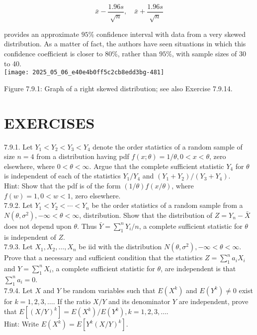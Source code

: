 $$
\bar{x}-\frac{1.96 s}{\sqrt{n}}, \quad \bar{x}+\frac{1.96 s}{\sqrt{n}}
$$

provides an approximate $95 \%$ confidence interval with data from a very skewed distribution. As a matter of fact, the authors have seen situations in which this confidence coefficient is closer to $80 \%$, rather than $95 \%$, with sample sizes of 30 to 40.\\
\texttt{[image: 2025\_05\_06\_e40e4b0ff5c2cb8edd3bg-481]}

Figure 7.9.1: Graph of a right skewed distribution; see also Exercise 7.9.14.

\section*{EXERCISES}
7.9.1. Let $Y_{1}<Y_{2}<Y_{3}<Y_{4}$ denote the order statistics of a random sample of size $n=4$ from a distribution having pdf $f(x ; \theta)=1 / \theta, 0<x<\theta$, zero elsewhere, where $0<\theta<\infty$. Argue that the complete sufficient statistic $Y_{4}$ for $\theta$ is independent of each of the statistics $Y_{1} / Y_{4}$ and $\left(Y_{1}+Y_{2}\right) /\left(Y_{3}+Y_{4}\right)$.\\
Hint: Show that the pdf is of the form $(1 / \theta) f(x / \theta)$, where $f(w)=1,0<w<1$, zero elsewhere.\\
7.9.2. Let $Y_{1}<Y_{2}<\cdots<Y_{n}$ be the order statistics of a random sample from a $N\left(\theta, \sigma^{2}\right),-\infty<\theta<\infty$, distribution. Show that the distribution of $Z=Y_{n}-\bar{X}$ does not depend upon $\theta$. Thus $\bar{Y}=\sum_{1}^{n} Y_{i} / n$, a complete sufficient statistic for $\theta$ is independent of $Z$.\\
7.9.3. Let $X_{1}, X_{2}, \ldots, X_{n}$ be iid with the distribution $N\left(\theta, \sigma^{2}\right),-\infty<\theta<\infty$. Prove that a necessary and sufficient condition that the statistics $Z=\sum_{1}^{n} a_{i} X_{i}$ and $Y=\sum_{1}^{n} X_{i}$, a complete sufficient statistic for $\theta$, are independent is that $\sum_{1}^{n} a_{i}=0$.\\
7.9.4. Let $X$ and $Y$ be random variables such that $E\left(X^{k}\right)$ and $E\left(Y^{k}\right) \neq 0$ exist for $k=1,2,3, \ldots$. If the ratio $X / Y$ and its denominator $Y$ are independent, prove that $E\left[(X / Y)^{k}\right]=E\left(X^{k}\right) / E\left(Y^{k}\right), k=1,2,3, \ldots$.\\
Hint: Write $E\left(X^{k}\right)=E\left[Y^{k}(X / Y)^{k}\right]$.\\
